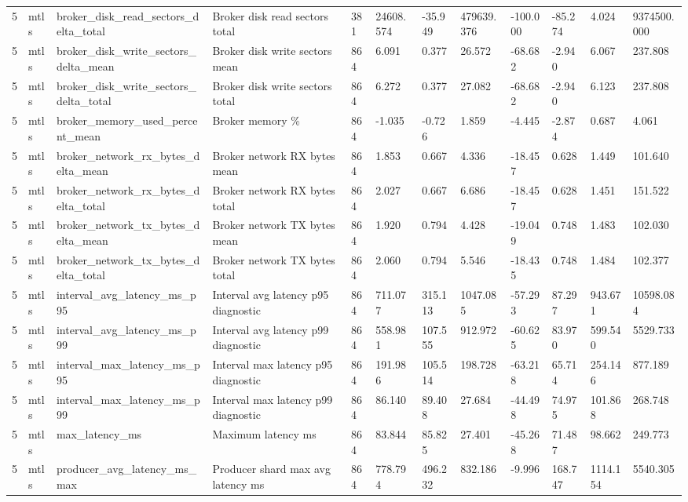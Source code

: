 \begin{longtable}{llllllllllll}
5 & mtls & broker\_disk\_read\_sectors\_delta\_total & Broker disk read sectors total & 381 & 24608.574 & -35.949 & 479639.376 & -100.000 & -85.274 & 4.024 & 9374500.000 \\
5 & mtls & broker\_disk\_write\_sectors\_delta\_mean & Broker disk write sectors mean & 864 & 6.091 & 0.377 & 26.572 & -68.682 & -2.940 & 6.067 & 237.808 \\
5 & mtls & broker\_disk\_write\_sectors\_delta\_total & Broker disk write sectors total & 864 & 6.272 & 0.377 & 27.082 & -68.682 & -2.940 & 6.123 & 237.808 \\
5 & mtls & broker\_memory\_used\_percent\_mean & Broker memory \% & 864 & -1.035 & -0.726 & 1.859 & -4.445 & -2.874 & 0.687 & 4.061 \\
5 & mtls & broker\_network\_rx\_bytes\_delta\_mean & Broker network RX bytes mean & 864 & 1.853 & 0.667 & 4.336 & -18.457 & 0.628 & 1.449 & 101.640 \\
5 & mtls & broker\_network\_rx\_bytes\_delta\_total & Broker network RX bytes total & 864 & 2.027 & 0.667 & 6.686 & -18.457 & 0.628 & 1.451 & 151.522 \\
5 & mtls & broker\_network\_tx\_bytes\_delta\_mean & Broker network TX bytes mean & 864 & 1.920 & 0.794 & 4.428 & -19.049 & 0.748 & 1.483 & 102.030 \\
5 & mtls & broker\_network\_tx\_bytes\_delta\_total & Broker network TX bytes total & 864 & 2.060 & 0.794 & 5.546 & -18.435 & 0.748 & 1.484 & 102.377 \\
5 & mtls & interval\_avg\_latency\_ms\_p95 & Interval avg latency p95 diagnostic & 864 & 711.077 & 315.113 & 1047.085 & -57.293 & 87.297 & 943.671 & 10598.084 \\
5 & mtls & interval\_avg\_latency\_ms\_p99 & Interval avg latency p99 diagnostic & 864 & 558.981 & 107.555 & 912.972 & -60.625 & 83.970 & 599.540 & 5529.733 \\
5 & mtls & interval\_max\_latency\_ms\_p95 & Interval max latency p95 diagnostic & 864 & 191.986 & 105.514 & 198.728 & -63.218 & 65.714 & 254.146 & 877.189 \\
5 & mtls & interval\_max\_latency\_ms\_p99 & Interval max latency p99 diagnostic & 864 & 86.140 & 89.408 & 27.684 & -44.498 & 74.975 & 101.868 & 268.748 \\
5 & mtls & max\_latency\_ms & Maximum latency ms & 864 & 83.844 & 85.825 & 27.401 & -45.268 & 71.487 & 98.662 & 249.773 \\
5 & mtls & producer\_avg\_latency\_ms\_max & Producer shard max avg latency ms & 864 & 778.794 & 496.232 & 832.186 & -9.996 & 168.747 & 1114.154 & 5540.305 \\

\end{longtable}
